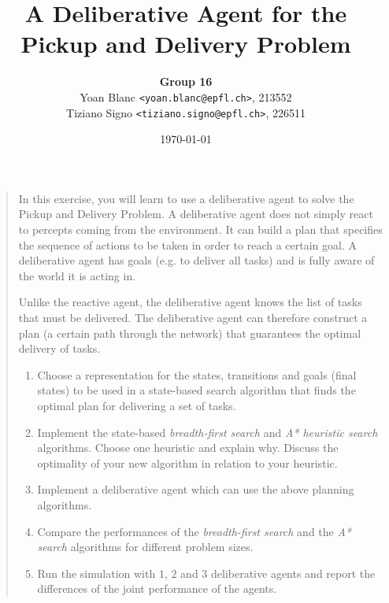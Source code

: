 \documentclass[11pt,a4paper]{article}
\title{\phantomsection%
    A Deliberative Agent for the Pickup and Delivery Problem
}
\author{
    \textbf{Group 16}\\
    Yoan Blanc \texttt{<yoan.blanc@epfl.ch>}, 213552\\
    Tiziano Signo \texttt{<tiziano.signo@epfl.ch>}, 226511
}
\date{\today}
\begin{document}
\maketitle

\noindent
\begin{quote}{\it

    In this exercise, you will learn to use a deliberative agent to solve the
    Pickup and Delivery Problem. A deliberative agent does not simply react to
    percepts coming from the environment. It can build a plan that specifies
    the sequence of actions to be taken in order to reach a certain goal. A
    deliberative agent has goals (e.g. to deliver all tasks) and is fully aware
    of the world it is acting in.

    Unlike the reactive agent, the deliberative agent knows the list of tasks
    that must be delivered. The deliberative agent can therefore construct a
    plan (a certain path through the network) that guarantees the optimal
    delivery of tasks.

    \begin{enumerate}
        \item Choose a representation for the states, transitions and goals
            (final states) to be used in a state-based search algorithm that
            finds the optimal plan for delivering a set of tasks.

        \item Implement the state-based \emph{breadth-first search} and
            \emph{A* heuristic search} algorithms.  Choose one heuristic and
            explain why. Discuss the optimality of your new algorithm in
            relation to your heuristic.

        \item Implement a deliberative agent which can use the above planning
            algorithms.

        \item Compare the performances of the \emph{breadth-first search} and
            the \emph{A* search} algorithms for different problem sizes.

        \item Run the simulation with $1$, $2$ and $3$ deliberative agents and
            report the differences of the joint performance of the agents.

    \end{enumerate}

}\end{quote}
\end{document}
